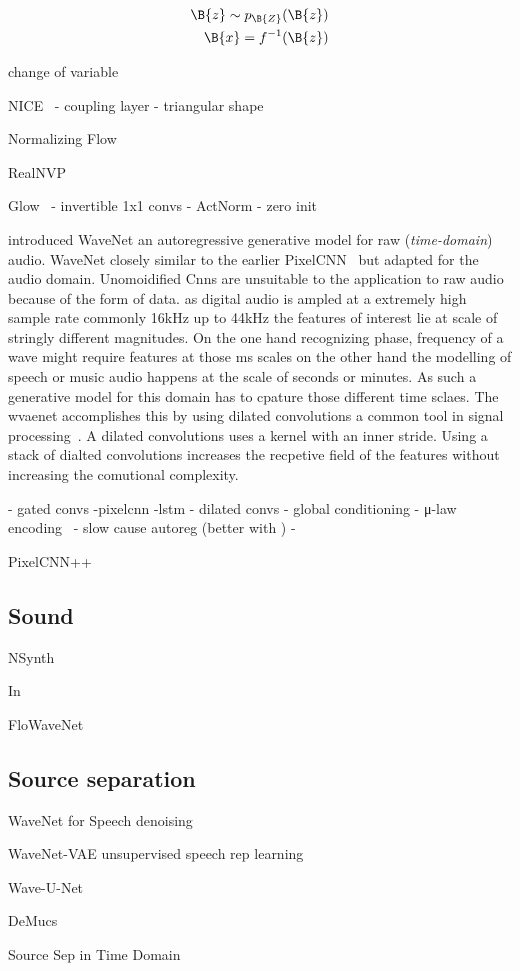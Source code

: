 \begin{align}
    \B{z}\sim p_{\B{Z}}(\B{z})\\
    \B{x} = f^{-1}(\B{z})
\end{align}

change of variable


NICE~\autocite{dinhNICE2015}
- coupling layer
- triangular shape

Normalizing Flow~\autocite{rezendeVariational2016}


RealNVP~\autocite{dinhDensity2017}

Glow~\autocite{kingmaGlow2018}
- invertible 1x1 convs
- ActNorm
- zero init


\autocite{vandenoordWaveNet2016} introduced WaveNet an autoregressive generative model for raw (\textit{time-domain}) audio. WaveNet closely similar to the earlier PixelCNN~\autocite{vandenoordConditional2016} but adapted for the audio domain. Unomoidified Cnns are unsuitable to the application to raw audio because of the form of data. as digital audio is ampled at a extremely high sample rate commonly 16kHz up to 44kHz the features of interest lie at scale of stringly different magnitudes. On the one hand recognizing phase, frequency of a wave might require features at those ms scales on the other hand the modelling of speech or music audio happens at the scale of seconds or minutes. As such a generative model for this domain has to cpature those different time sclaes. The wvaenet accomplishes this by using dilated convolutions a common tool in signal processing~\autocite{dutilleuxImplementation1990}. A dilated convolutions uses a kernel with an inner stride. Using a stack of dialted convolutions increases the recpetive field of the features without increasing the comutional complexity.

- gated convs -pixelcnn -lstm\autocite{hochreiterLong1997a}
- dilated convs
- global conditioning
- μ-law encoding~\autocite{Recommendation1988}
- slow cause autoreg (better with \autocite{paineFast2016})
-

PixelCNN++~\autocite{salimansPixelCNN2017}


\subsection{Sound}
NSynth~\autocite{kalchbrennerEfficient2018}

In~\autocite{prengerWaveGlow2018}

FloWaveNet~\autocite{kimFloWaveNet2019a}

\subsection{Source separation}
WaveNet for Speech denoising\autocite{rethageWavenet2018}

WaveNet-VAE unsupervised speech rep learning\autocite{chorowskiUnsupervised2019}

Wave-U-Net\autocite{stollerWaveUNet2018}

DeMucs\autocite{defossezDemucs2019}

Source Sep in Time Domain\autocite{lluisEndtoend2019}
